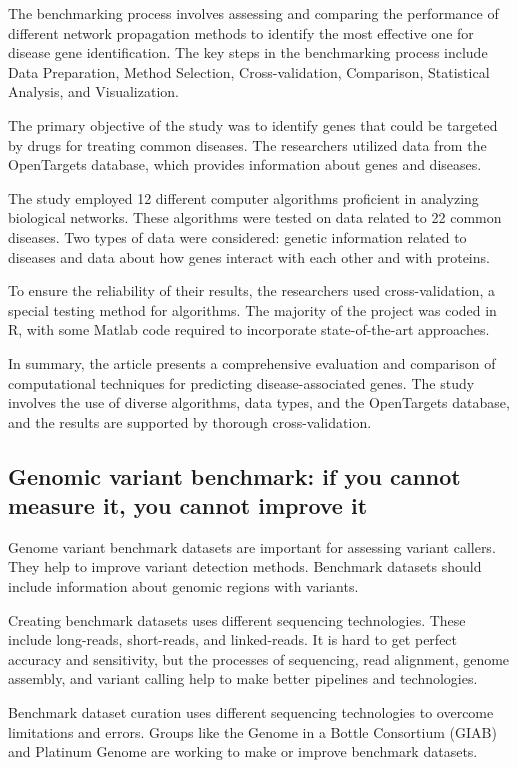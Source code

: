 The benchmarking process involves assessing and comparing the performance of different network propagation methods to identify the most effective one for disease gene identification. The key steps in the benchmarking process include Data Preparation, Method Selection, Cross-validation, Comparison, Statistical Analysis, and Visualization.

The primary objective of the study was to identify genes that could be targeted by drugs for treating common diseases. The researchers utilized data from the OpenTargets database, which provides information about genes and diseases.

The study employed 12 different computer algorithms proficient in analyzing biological networks. These algorithms were tested on data related to 22 common diseases. Two types of data were considered: genetic information related to diseases and data about how genes interact with each other and with proteins.

To ensure the reliability of their results, the researchers used cross-validation, a special testing method for algorithms. The majority of the project was coded in R, with some Matlab code required to incorporate state-of-the-art approaches.

In summary, the article presents a comprehensive evaluation and comparison of computational techniques for predicting disease-associated genes. The study involves the use of diverse algorithms, data types, and the OpenTargets database, and the results are supported by thorough cross-validation.

 
\subsection{Genomic variant benchmark: if you cannot measure it, you cannot improve it\cite{11} }
Genome variant benchmark datasets are important for assessing variant callers. They help to improve variant detection methods. Benchmark datasets should include information about genomic regions with variants.

Creating benchmark datasets uses different sequencing technologies. These include long-reads, short-reads, and linked-reads. It is hard to get perfect accuracy and sensitivity, but the processes of sequencing, read alignment, genome assembly, and variant calling help to make better pipelines and technologies.

Benchmark dataset curation uses different sequencing technologies to overcome limitations and errors. Groups like the Genome in a Bottle Consortium (GIAB) and Platinum Genome are working to make or improve benchmark datasets.

